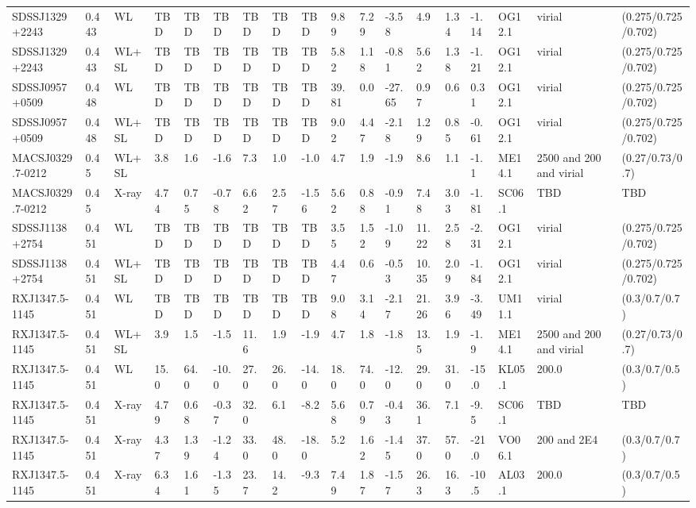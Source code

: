 \documentclass{article}
\begin{document}
\begin{center}
\begin{landscape}
\begin{longtable}{llllllllllllllllll}
SDSSJ1329+2243 & 0.443 & WL & TBD & TBD & TBD & TBD & TBD & TBD & 9.89 & 7.29 & -3.58 & 4.9 & 1.34 & -1.14 & OG12.1 & virial & (0.275/0.725/0.702) \\
SDSSJ1329+2243 & 0.443 & WL+SL & TBD & TBD & TBD & TBD & TBD & TBD & 5.82 & 1.18 & -0.81 & 5.62 & 1.38 & -1.21 & OG12.1 & virial & (0.275/0.725/0.702) \\
SDSSJ0957+0509 & 0.448 & WL & TBD & TBD & TBD & TBD & TBD & TBD & 39.81 & 0.0 & -27.65 & 0.97 & 0.6 & 0.31 & OG12.1 & virial & (0.275/0.725/0.702) \\
SDSSJ0957+0509 & 0.448 & WL+SL & TBD & TBD & TBD & TBD & TBD & TBD & 9.02 & 4.47 & -2.18 & 1.29 & 0.85 & -0.61 & OG12.1 & virial & (0.275/0.725/0.702) \\
MACSJ0329.7-0212 & 0.45 & WL+SL & 3.8 & 1.6 & -1.6 & 7.3 & 1.0 & -1.0 & 4.7 & 1.9 & -1.9 & 8.6 & 1.1 & -1.1 & ME14.1 & 2500 and 200 and virial & (0.27/0.73/0.7) \\
MACSJ0329.7-0212 & 0.45 & X-ray & 4.74 & 0.75 & -0.78 & 6.62 & 2.57 & -1.56 & 5.62 & 0.88 & -0.91 & 7.48 & 3.03 & -1.81 & SC06.1 & TBD & TBD \\
SDSSJ1138+2754 & 0.451 & WL & TBD & TBD & TBD & TBD & TBD & TBD & 3.55 & 1.52 & -1.09 & 11.22 & 2.58 & -2.31 & OG12.1 & virial & (0.275/0.725/0.702) \\
SDSSJ1138+2754 & 0.451 & WL+SL & TBD & TBD & TBD & TBD & TBD & TBD & 4.47 & 0.6 & -0.53 & 10.35 & 2.09 & -1.84 & OG12.1 & virial & (0.275/0.725/0.702) \\
RXJ1347.5-1145 & 0.451 & WL & TBD & TBD & TBD & TBD & TBD & TBD & 9.08 & 3.14 & -2.17 & 21.26 & 3.96 & -3.49 & UM11.1 & virial & (0.3/0.7/0.7) \\
RXJ1347.5-1145 & 0.451 & WL+SL & 3.9 & 1.5 & -1.5 & 11.6 & 1.9 & -1.9 & 4.7 & 1.8 & -1.8 & 13.5 & 1.9 & -1.9 & ME14.1 & 2500 and 200 and virial & (0.27/0.73/0.7) \\
RXJ1347.5-1145 & 0.451 & WL & 15.0 & 64.0 & -10.0 & 27.0 & 26.0 & -14.0 & 18.0 & 74.0 & -12.0 & 29.0 & 31.0 & -15.0 & KL05.1 & 200.0 & (0.3/0.7/0.5) \\
RXJ1347.5-1145 & 0.451 & X-ray & 4.79 & 0.68 & -0.37 & 32.0 & 6.1 & -8.2 & 5.68 & 0.79 & -0.43 & 36.1 & 7.1 & -9.5 & SC06.1 & TBD & TBD \\
RXJ1347.5-1145 & 0.451 & X-ray & 4.37 & 1.39 & -1.24 & 33.0 & 48.0 & -18.0 & 5.2 & 1.62 & -1.45 & 37.0 & 57.0 & -21.0 & VO06.1 & 200 and 2E4 & (0.3/0.7/0.7) \\
RXJ1347.5-1145 & 0.451 & X-ray & 6.34 & 1.61 & -1.35 & 23.7 & 14.2 & -9.3 & 7.49 & 1.87 & -1.57 & 26.3 & 16.3 & -10.5 & AL03.1 & 200.0 & (0.3/0.7/0.5) \\

\end{longtable}
\end{landscape}
\end{center}
\end{document}
